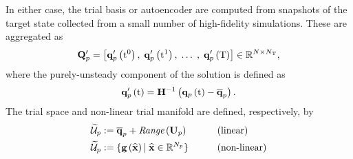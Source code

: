 %
In either case, the trial basis or autoencoder are computed from snapshots of the target state collected from a small number of high-fidelity simulations. These are aggregated as
%
\begin{equation}\label{eq:primSnapMat}
	\primDataMatUns = \left[ \primFuncUns{\initTime}, \; \primFuncUns{\timeVar^1}, \; \hdots \; , \; \primFuncUns{\finalTime} \right] \inRTwo{\numDOF}{\numSnaps},
\end{equation}
%
where the purely-unsteady component of the solution is defined as
%
\begin{equation}\label{eq:primUns}
	\primFuncUns{\timeVar} = \primScaleInv \left(\primFunc{\timeVar} - \primVecCent\right).
\end{equation}
%
The trial space and non-linear trial manifold are defined, respectively, by
%
\begin{alignat}{2}
    \primTrialSpace &\defEq \primVecCent + \textit{Range}\left(\primTrial\right) \qquad &&\text{(linear)}\\
    \primTrialSpace &\defEq \{\decoderFunc{\nnInputCoef} \vert \; \nnInputCoef \inROne{\numPrimModes} \} \qquad &&\text{(non-linear)}
\end{alignat}
%

